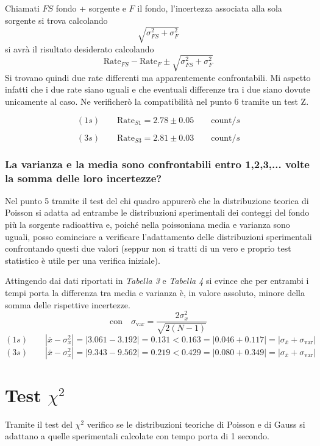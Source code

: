 \documentclass{article}
\begin{document}
Chiamati $FS$ fondo + sorgente e $F$ il fondo, l'incertezza associata alla sola sorgente si trova calcolando
\[
	\sqrt{\sigma_{FS}^2 + \sigma_{F}^2}
\]
si avrà il risultato desiderato calcolando
\[
	\text{Rate}_{FS} - \text{Rate}_F \pm \sqrt{\sigma_{FS}^2 + \sigma_{F}^2}
\]
Si trovano quindi due rate differenti ma apparentemente confrontabili. Mi aspetto infatti che i due rate siano uguali e che eventuali differenze tra i due siano dovute unicamente al caso. Ne verificherò la compatibilità nel punto 6 tramite un test Z.

\[
	(1s) \qquad \text{Rate}_{S1} = 2.78 \pm 0.05 \qquad \text{count}/s
\]

\[
	(3s) \qquad \text{Rate}_{S3} =  2.81 \pm 0.03  \qquad \text{count}/s
\]

\subsubsection*{La varianza e la media sono confrontabili entro 1,2,3,... volte la somma delle loro incertezze?}
Nel punto 5 tramite il test del chi quadro appurerò che la distribuzione teorica di Poisson si adatta ad entrambe le distribuzioni sperimentali dei conteggi del fondo più la sorgente radioattiva e, poiché nella poissoniana media e varianza sono uguali, posso cominciare a verificare l'adattamento delle distribuzioni sperimentali confrontando questi due valori (seppur non si tratti di un vero e proprio test statistico è utile per una verifica iniziale). 

Attingendo dai dati riportati in \textit{Tabella 3} e \textit{Tabella 4} si evince che per entrambi i tempi porta la differenza tra media e varianza è, in valore assoluto, minore della somma delle rispettive incertezze. 
\[
	\text{con} \quad \sigma_{\text{var}} = \frac{2\sigma_x^2}{\sqrt{2(N-1)}}
\]
\[
	(1s) \qquad |\bar{x} - \sigma_x^2| = 	|3.061 - 3.192| = \mathbf{0.131  < 0.163} = |0.046 + 0.117| =|\sigma_{\bar{x}} + \sigma_{\text{var}}| 
\]
\[
	(3s) \qquad |\bar{x} - \sigma_x^2| = 	|9.343 - 9.562| = \mathbf{0.219  < 0.429} = |0.080 + 0.349| =|\sigma_{\bar{x}} + \sigma_{\text{var}}| 
\]

\newpage
\section{Test \texorpdfstring{\(\chi^2\)}{chi}}
Tramite il test del \(\chi^2\) verifico se le distribuzioni teoriche di Poisson e di Gauss si adattano a quelle sperimentali calcolate con tempo porta di 1 secondo. \\
\end{document}
